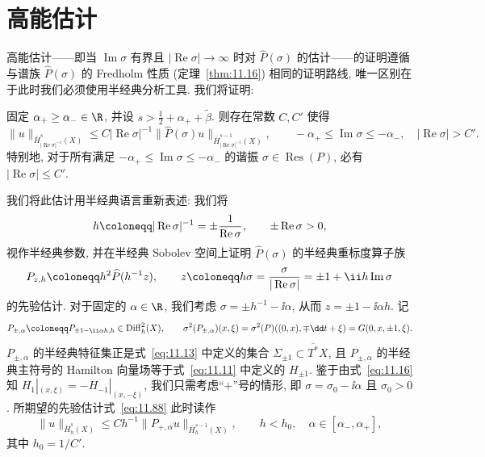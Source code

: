 \section{高能估计}\label{sec:11.4}
%
%
%

高能估计——即当 $\operatorname{Im}\sigma$ 有界且 $|\operatorname{Re}\sigma| \to \infty$ 时对 $\widehat{P}(\sigma)$ 的估计——的证明遵循与谱族 $\widehat{P}(\sigma)$ 的 Fredholm 性质 (定理~\ref{thm:11.16}) 相同的证明路线, 唯一区别在于此时我们必须使用半经典分析工具. 我们将证明:

\begin{theorem}[高能估计]\label{thm:11.21}
固定 $\alpha_+ \ge \alpha_- \in \R$, 并设 $s > \frac{1}{2} + \alpha_+ + \tilde\beta$. 则存在常数 $C, C'$ 使得
\begin{equation}\label{eq:11.88}
    \|u\|_{\bar H_{|\operatorname{Re}\sigma|^{-1}}^s(X)} \le C |\operatorname{Re}\sigma|^{-1} \|\widehat{P}(\sigma) u\|_{\bar H_{|\operatorname{Re}\sigma|^{-1}}^{s-1}(X)}, \qquad -\alpha_+ \le \operatorname{Im}\sigma \le -\alpha_-, \quad |\operatorname{Re}\sigma| > C'.
\end{equation}
特别地, 对于所有满足 $-\alpha_+ \le \operatorname{Im}\sigma \le -\alpha_-$ 的谐振 $\sigma \in \operatorname{Res}(P)$, 必有 $|\operatorname{Re}\sigma| \le C'$.
\end{theorem}

我们将此估计用半经典语言重新表述: 我们将
\begin{equation}\label{eq:11.89}
    h \defeq |\operatorname{Re}\sigma|^{-1} = \pm \frac{1}{\operatorname{Re}\sigma}, \qquad \pm \operatorname{Re}\sigma > 0,
\end{equation}
视作半经典参数, 并在半经典 Sobolev 空间上证明 $\widehat{P}(\sigma)$ 的半经典重标度算子族
\begin{equation}\label{eq:11.90}
    P_{z, h} \defeq h^2 \widehat{P}(h^{-1} z), \qquad z \defeq h\sigma = \frac{\sigma}{|\operatorname{Re}\sigma|} = \pm 1 + \ii h \operatorname{Im}\sigma
\end{equation}
的先验估计. 对于固定的 $\alpha \in \R$, 我们考虑 $\sigma = \pm h^{-1} - \ii \alpha$, 从而 $z = \pm 1 - \ii \alpha h$. 记
\begin{equation}\label{eq:11.91}
    P_{\pm, \alpha} \defeq P_{\pm 1 - \ii \alpha h, h} \in \Diff_h^2(X), \qquad \sigma^2(P_{\pm, \alpha})(x, \xi) = \sigma^2(P)((0, x), \mp \dd t + \xi) = G(0, x, \pm 1, \xi).
\end{equation}
$P_{\pm, \alpha}$ 的半经典特征集正是式~\eqref{eq:11.13} 中定义的集合 $\Sigma_{\pm 1} \subset \overline{T^*} X$, 且 $P_{\pm, \alpha}$ 的半经典主符号的 Hamilton 向量场等于式~\eqref{eq:11.11} 中定义的 $H_{\pm 1}$. 鉴于由式~\eqref{eq:11.16} 知 $H_1|_{(x, \xi)} = -H_{-1}|_{(x, -\xi)}$, 我们只需考虑“$+$”号的情形, 即 $\sigma = \sigma_0 - \ii \alpha$ 且 $\sigma_0 > 0$. 所期望的先验估计式~\eqref{eq:11.88} 此时读作
\begin{equation}\label{eq:11.92}
    \|u\|_{\bar H_h^s(X)} \le C h^{-1} \|P_{+, \alpha} u\|_{\bar H_h^{s-1}(X)}, \qquad h < h_0, \quad \alpha \in [\alpha_-, \alpha_+],
\end{equation}
其中 $h_0 = 1/C'$.

